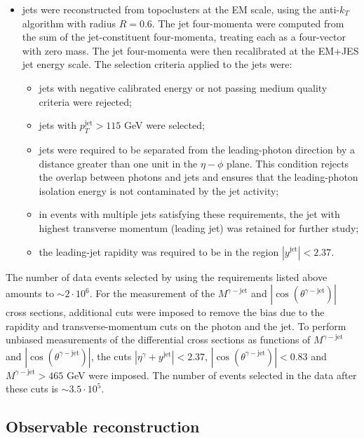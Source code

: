 \documentclass[12pt, twoside]{article}
\numberwithin{equation}{section}
\numberwithin{figure}{section}
\begin{document}
\begin{itemize}
    \item jets were reconstructed from topoclusters at the EM scale, using the anti-$k_{T}$ algorithm with radius $R = 0.6$. The jet four-momenta were computed from the sum of the jet-constituent four-momenta, treating each as a four-vector with zero mass. The jet four-momenta were then recalibrated at the EM+JES jet energy scale. The selection criteria applied to the jets were:
    \begin{itemize}
        \item jets with negative calibrated energy or not passing medium quality criteria were rejected;
        \item jets with $p^{\text{jet}}_{T} > 115$ GeV were selected;
        \item jets were required to be separated from the leading-photon direction by a distance greater than one unit in the $\eta - \phi$ plane. This condition rejects the overlap between photons and jets and ensures that the leading-photon isolation energy is not contaminated by the jet activity;
        \item in events with multiple jets satisfying these requirements, the jet with highest transverse momentum (leading jet) was retained for further study;
        \item the leading-jet rapidity was required to be in the region $\left| y^{\text{jet}} \right| < 2.37$.
    \end{itemize}
\end{itemize}

The number of data events selected by using the requirements listed above amounts to $\sim 2 \cdot 10^{6}$. For the measurement of the $M^{\gamma-\text{jet}}$ and $\left| \cos \left( \theta^{\gamma-\text{jet}} \right) \right|$ cross sections, additional cuts were imposed to remove the bias due to the rapidity and transverse-momentum cuts on the photon and the jet. To perform unbiased measurements of the differential cross sections as functions of $M^{\gamma-\text{jet}}$ and $\left| \cos \left( \theta^{\gamma-\text{jet}} \right) \right|$, the cuts $\left| \eta^{\gamma} + y^{\text{jet}} \right| < 2.37$, $\left| \cos \left( \theta^{\gamma-\text{jet}} \right) \right| < 0.83$ and $M^{\gamma-\text{jet}} > 465$ GeV were imposed. The number of events selected in the data after these cuts is $\sim 3.5 \cdot 10^{5}$.

\subsection{Observable reconstruction}
\label{subsec:ObservableReconstruction}
\end{document}
